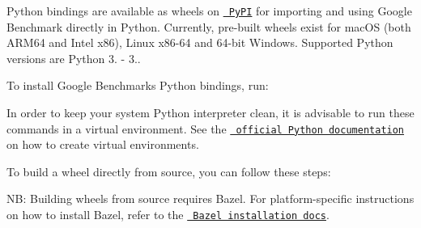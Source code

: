 Python bindings are available as wheels on \href{https://pypi.org/project/google-benchmark/}{\texttt{ Py\+PI}} for importing and using Google Benchmark directly in Python. Currently, pre-\/built wheels exist for mac\+OS (both ARM64 and Intel x86), Linux x86-\/64 and 64-\/bit Windows. Supported Python versions are Python 3. -\/ 3..

To install Google Benchmark\textquotesingle{}s Python bindings, run\+:


\begin{DoxyCode}{0}

\end{DoxyCode}


In order to keep your system Python interpreter clean, it is advisable to run these commands in a virtual environment. See the \href{https://docs.python.org/3/library/venv.html}{\texttt{ official Python documentation}} on how to create virtual environments.

To build a wheel directly from source, you can follow these steps\+: 
\begin{DoxyCode}{0}
\DoxyCodeLine{}

\end{DoxyCode}


NB\+: Building wheels from source requires Bazel. For platform-\/specific instructions on how to install Bazel, refer to the \href{https://bazel.build/install}{\texttt{ Bazel installation docs}}. 